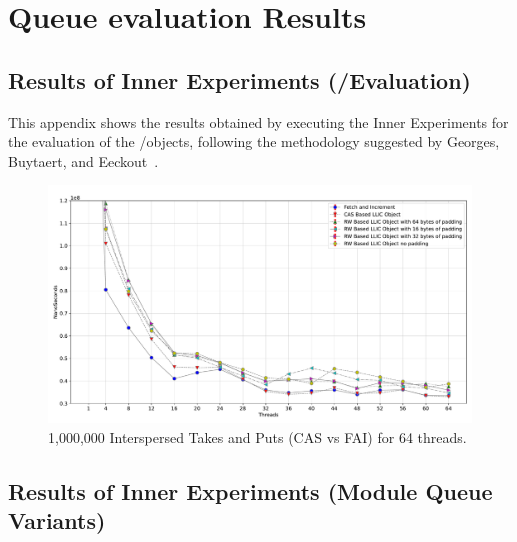 \clearpage{}

\chapter{Queue evaluation Results}
\section{\label{sec:appendix-llic-performance}Results of Inner Experiments (\LL/\IC Evaluation)}

This appendix shows the results obtained by executing the Inner Experiments for the evaluation of the \LL/\IC objects, following the methodology suggested by Georges, Buytaert, and Eeckout~\cite{DBLP_conf_oopsla_GeorgesBE07}.

\begin{figure}[ht]
  \centering
  \includegraphics[scale=0.4]{contents/backmatter/evaluation/llic_64_insert_extract.pdf}
  \caption{\label{fig:appx-llic-64-insert-extract} 1,000,000 Interspersed Takes and Puts (CAS vs FAI) for 64 threads.}
\end{figure}





\section{\label{sec:appendix-inner-queues}Results of Inner Experiments (Module Queue Variants)}

